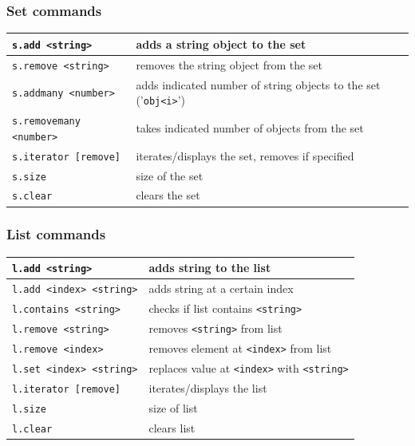 \subsubsection*{Set commands}
\begin{tabular}{|p{}|p{}|}
    \hline
    \texttt{s.add <string>} & adds a string object to the set\\\hline
    \texttt{s.remove <string>} & removes the string object from the set\\\hline
    \texttt{s.addmany <number>} & adds indicated number of string objects to the set ('\texttt{obj<i>}')\\\hline
    \texttt{s.removemany <number>} & takes indicated number of objects from the set\\\hline
    \texttt{s.iterator [remove] } & iterates/displays the set, removes if specified\\\hline
    \texttt{s.size} & size of the set\\\hline
    \texttt{s.clear} & clears the set\\\hline
\end{tabular}
\subsubsection*{List commands}
\begin{tabular}{|p{}|p{}|}
    \hline
    \texttt{l.add <string>} & adds string to the list\\\hline
    \texttt{l.add <index> <string>} & adds string at a certain index\\\hline
    \texttt{l.contains <string>} & checks if list contains \texttt{<string>}\\\hline
    \texttt{l.remove <string>} & removes \texttt{<string>} from list\\\hline
    \texttt{l.remove <index>} & removes element at \texttt{<index>} from list\\\hline
    \texttt{l.set <index> <string>} & replaces value at \texttt{<index>} with \texttt{<string>}\\\hline
    \texttt{l.iterator [remove]} & iterates/displays the list\\\hline
    \texttt{l.size} & size of list\\\hline
    \texttt{l.clear} & clears list\\\hline
\end{tabular}
